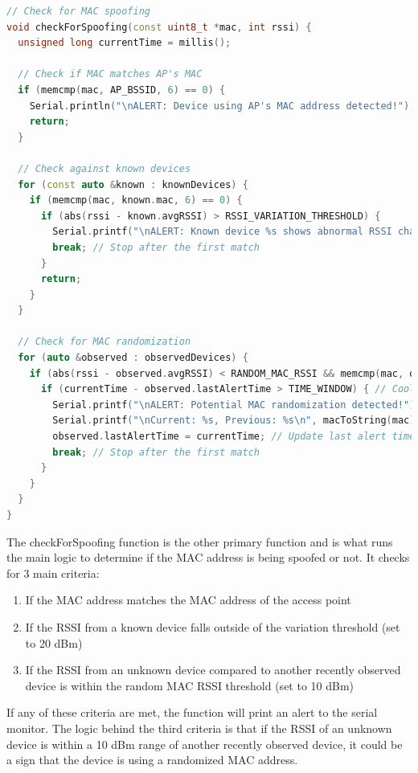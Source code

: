 \documentclass[letterpaper, 11pt]{article}
\begin{document}
\newpage
\begin{lstlisting}[language=C++, caption=Spoof Detection, label=lst:spoof detector]
// Check for MAC spoofing
void checkForSpoofing(const uint8_t *mac, int rssi) {
  unsigned long currentTime = millis();

  // Check if MAC matches AP's MAC
  if (memcmp(mac, AP_BSSID, 6) == 0) {
    Serial.println("\nALERT: Device using AP's MAC address detected!");
    return;
  }

  // Check against known devices
  for (const auto &known : knownDevices) {
    if (memcmp(mac, known.mac, 6) == 0) {
      if (abs(rssi - known.avgRSSI) > RSSI_VARIATION_THRESHOLD) {
        Serial.printf("\nALERT: Known device %s shows abnormal RSSI change! Current RSSI: %d dBm, Known Avg RSSI: %d dBm", macToString(mac).c_str(), rssi, known.avgRSSI);
        break; // Stop after the first match
      }
      return;
    }
  }

  // Check for MAC randomization
  for (auto &observed : observedDevices) {
    if (abs(rssi - observed.avgRSSI) < RANDOM_MAC_RSSI && memcmp(mac, observed.mac, 6) != 0 && (currentTime - observed.lastSeen) < TIME_WINDOW) {
      if (currentTime - observed.lastAlertTime > TIME_WINDOW) { // Cooldown check
        Serial.printf("\nALERT: Potential MAC randomization detected!");
        Serial.printf("\nCurrent: %s, Previous: %s\n", macToString(mac).c_str(), macToString(observed.mac).c_str());
        observed.lastAlertTime = currentTime; // Update last alert time
        break; // Stop after the first match
      }
    }
  }
}
\end{lstlisting}
The checkForSpoofing function is the other primary function and is what runs the main logic to determine if the MAC address is being spoofed or not. It checks for 3 main criteria:
\begin{enumerate}
    \item If the MAC address matches the MAC address of the access point
    \item If the RSSI from a known device falls outside of the variation threshold (set to 20 dBm)
    \item If the RSSI from an unknown device compared to another recently observed device is within the random MAC RSSI threshold (set to 10 dBm) 
\end{enumerate}
If any of these criteria are met, the function will print an alert to the serial monitor. The logic behind the third criteria is that if the RSSI of an unknown device is within a 10 dBm range
of another recently observed device, it could be a sign that the device is using a randomized MAC address.
\end{document}
